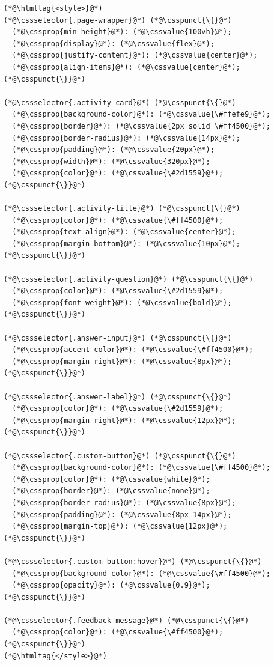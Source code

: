 \documentclass{article}
\begin{document}
\pagebreak
\tiny{
  \begin{lstlisting}
(*@\htmltag{<style>}@*)
(*@\cssselector{.page-wrapper}@*) (*@\csspunct{\{}@*)
  (*@\cssprop{min-height}@*): (*@\cssvalue{100vh}@*);
  (*@\cssprop{display}@*): (*@\cssvalue{flex}@*);
  (*@\cssprop{justify-content}@*): (*@\cssvalue{center}@*);
  (*@\cssprop{align-items}@*): (*@\cssvalue{center}@*);
(*@\csspunct{\}}@*)

(*@\cssselector{.activity-card}@*) (*@\csspunct{\{}@*)
  (*@\cssprop{background-color}@*): (*@\cssvalue{\#ffefe9}@*);
  (*@\cssprop{border}@*): (*@\cssvalue{2px solid \#ff4500}@*);
  (*@\cssprop{border-radius}@*): (*@\cssvalue{14px}@*);
  (*@\cssprop{padding}@*): (*@\cssvalue{20px}@*);
  (*@\cssprop{width}@*): (*@\cssvalue{320px}@*);
  (*@\cssprop{color}@*): (*@\cssvalue{\#2d1559}@*);
(*@\csspunct{\}}@*)

(*@\cssselector{.activity-title}@*) (*@\csspunct{\{}@*)
  (*@\cssprop{color}@*): (*@\cssvalue{\#ff4500}@*);
  (*@\cssprop{text-align}@*): (*@\cssvalue{center}@*);
  (*@\cssprop{margin-bottom}@*): (*@\cssvalue{10px}@*);
(*@\csspunct{\}}@*)

(*@\cssselector{.activity-question}@*) (*@\csspunct{\{}@*)
  (*@\cssprop{color}@*): (*@\cssvalue{\#2d1559}@*);
  (*@\cssprop{font-weight}@*): (*@\cssvalue{bold}@*);
(*@\csspunct{\}}@*)

(*@\cssselector{.answer-input}@*) (*@\csspunct{\{}@*)
  (*@\cssprop{accent-color}@*): (*@\cssvalue{\#ff4500}@*);
  (*@\cssprop{margin-right}@*): (*@\cssvalue{8px}@*);
(*@\csspunct{\}}@*)

(*@\cssselector{.answer-label}@*) (*@\csspunct{\{}@*)
  (*@\cssprop{color}@*): (*@\cssvalue{\#2d1559}@*);
  (*@\cssprop{margin-right}@*): (*@\cssvalue{12px}@*);
(*@\csspunct{\}}@*)

(*@\cssselector{.custom-button}@*) (*@\csspunct{\{}@*)
  (*@\cssprop{background-color}@*): (*@\cssvalue{\#ff4500}@*);
  (*@\cssprop{color}@*): (*@\cssvalue{white}@*);
  (*@\cssprop{border}@*): (*@\cssvalue{none}@*);
  (*@\cssprop{border-radius}@*): (*@\cssvalue{8px}@*);
  (*@\cssprop{padding}@*): (*@\cssvalue{8px 14px}@*);
  (*@\cssprop{margin-top}@*): (*@\cssvalue{12px}@*);
(*@\csspunct{\}}@*)

(*@\cssselector{.custom-button:hover}@*) (*@\csspunct{\{}@*)
  (*@\cssprop{background-color}@*): (*@\cssvalue{\#ff4500}@*);
  (*@\cssprop{opacity}@*): (*@\cssvalue{0.9}@*);
(*@\csspunct{\}}@*)

(*@\cssselector{.feedback-message}@*) (*@\csspunct{\{}@*)
  (*@\cssprop{color}@*): (*@\cssvalue{\#ff4500}@*);
(*@\csspunct{\}}@*)
(*@\htmltag{</style>}@*)


\end{lstlisting}}
\end{document}
